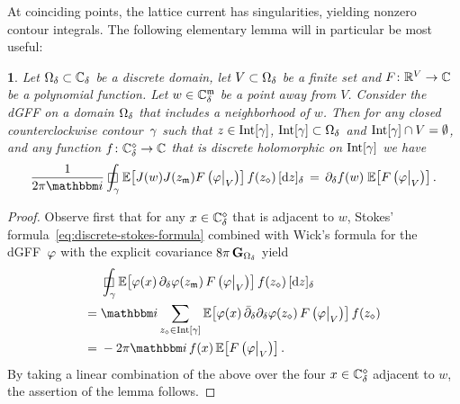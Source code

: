 \documentclass[12pt,oneside,english]{amsart}
\numberwithin{equation}{section}
\numberwithin{figure}{section}
\theoremstyle{plain}
\theoremstyle{plain}
\theoremstyle{plain}
\theoremstyle{plain}
\newtheorem{lem}[thm]{\protect\lemmaname}
\theoremstyle{remark}
\theoremstyle{definition}
\theoremstyle{plain}
\theoremstyle{plain}
\numberwithin{thm}{section}
\providecommand{\lemmaname}{Lemma}
\providecommand{\lemmaname}{Lemma}
\providecommand{\lemmaname}{Lemma}
\providecommand{\lemmaname}{Lemma}
\begin{document}
At coinciding points, the lattice current has singularities, yielding
nonzero contour integrals. The following elementary lemma will in
particular be most useful: 
\begin{lem}
\label{lem:two-current-contour-integral}Let ${{\Omega}}_{{\delta}}\subset{\mathbb{C}_{{\delta}}}$
be a discrete domain, let $V\subset{{\Omega}}_{{\delta}}$ be a finite set
and $F \colon  \mathbb{R}^{V} \to  \mathbb{C} $ be a polynomial function. Let
$w\in{\mathbb{C}_{{\delta}}^{\mathfrak{m}}}$ be a point away from $V$. Consider
the dGFF on a domain ${{\Omega}}_{{\delta}}$ that includes a neighborhood
of $w$. Then for any
closed counterclockwise contour~$\gamma$ such that
$z\in \mathrm{Int}[{\gamma}]$,
$\mathrm{Int}[{\gamma}]\subset{{\Omega}}_{{\delta}}$ and
$\mathrm{Int}[{\gamma}]\cap V = \emptyset$,
and any function $f \colon {\mathbb{C}_{{\delta}}^{\diamond}} \to \mathbb{C}$
that is discrete holomorphic on $\mathrm{Int}[{\gamma}]$ we have
\[
\frac{1}{2\pi \ii}\dcint{\contour} 
  \correl{ \curr (w) \curr (z_{\mdl})
      F \left( \DGFF\big|_{V} \right) }
      f(z_{\dmd}) \, \dd{z}
\, = \, \ddee f(w) \; \correl{ F\left(\DGFF\big|_{V}\right) } .
\]
\end{lem}
\begin{proof}
Observe first that for any $x\in{\mathbb{C}_{{\delta}}^{\diamond}}$ that
is adjacent to $w$, Stokes' formula~\eqref{eq:discrete-stokes-formula}
combined with Wick's formula for the dGFF~${\varphi}$ %
with the explicit covariance $8 \pi \, \mathbf{G}_{{{\Omega}}_{{\delta}}}$ yield
\begin{align*}
& %
\dcint{\contour} 
  \correl{ \DGFF (x) \, \ddee \DGFF (z_{\mdl})  \,
      F \left(\DGFF\big|_{V} \right) }
  f (z_{\dmd}) \, \dd{z} \\
= \; & %
  \ii \sum_{z_\dmd \in \interior\contour}
  \correl{ \DGFF (x) \, \ddeebar \ddee \DGFF (z_{\dmd}) \,
      F \left(\DGFF\big|_{V} \right) }
  f (z_{\dmd}) \\
= \; & - 2 \pi \ii \, f(x) \,
    \correl{ F\left(\DGFF\big|_{V}\right) } .
\end{align*}
By taking a linear combination of the above over the
four $x\in{\mathbb{C}_{{\delta}}^{\diamond}}$ adjacent to $w$,
the assertion of the lemma follows.
\end{proof}
\end{document}
